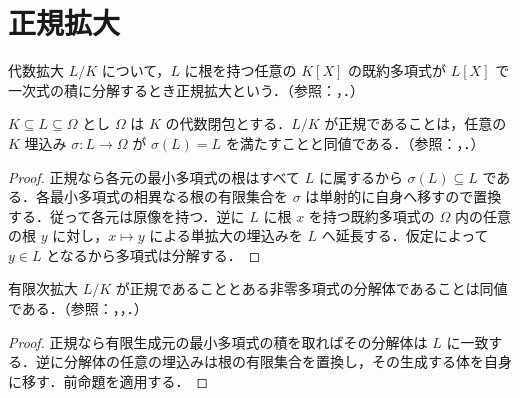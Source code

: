 \section{正規拡大}
\begin{defn}[正規拡大]
代数拡大 $L/K$ について，$L$ に根を持つ任意の $K[X]$ の既約多項式が $L[X]$ で一次式の積に分解するとき正規拡大という．（参照：，．）
\end{defn}
\begin{prop}[正規性と埋込み]
$K\subseteq L\subseteq\Omega$ とし $\Omega$ は $K$ の代数閉包とする．$L/K$ が正規であることは，任意の $K$ 埋込み $\sigma:L\to\Omega$ が $\sigma(L)=L$ を満たすことと同値である．（参照：，．）
\end{prop}
\begin{proof}
正規なら各元の最小多項式の根はすべて $L$ に属するから $\sigma(L)\subseteq L$ である．各最小多項式の相異なる根の有限集合を $\sigma$ は単射的に自身へ移すので置換する．従って各元は原像を持つ．逆に $L$ に根 $x$ を持つ既約多項式の $\Omega$ 内の任意の根 $y$ に対し，$x\mapsto y$ による単拡大の埋込みを $L$ へ延長する．仮定によって $y\in L$ となるから多項式は分解する．
\end{proof}
\begin{prop}[分解体による正規性の特徴づけ]
有限次拡大 $L/K$ が正規であることとある非零多項式の分解体であることは同値である．（参照：，，．）
\end{prop}
\begin{proof}
正規なら有限生成元の最小多項式の積を取ればその分解体は $L$ に一致する．逆に分解体の任意の埋込みは根の有限集合を置換し，その生成する体を自身に移す．前命題を適用する．
\end{proof}
